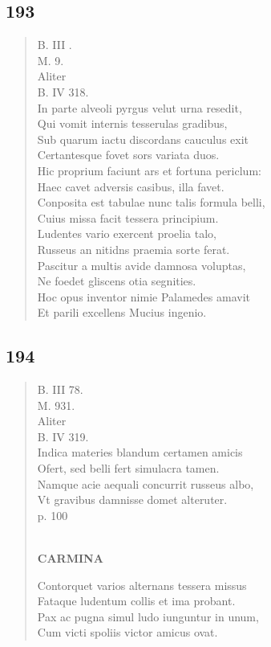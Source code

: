 \documentclass[11pt, a4paper]{report}
\begin{document}
            \subsection*{193}
      \begin{verse}
      B. III . \\ M. 9. \\ Aliter \\ B. IV 318. \\ In parte alveoli pyrgus velut urna resedit, \\ Qui vomit internis tesserulas gradibus, \\ Sub quarum iactu discordans cauculus exit \\ Certantesque fovet sors variata duos. \\ Hic proprium faciunt  \lbrack ars \rbrack  et fortuna periclum: \\ Haec cavet adversis casibus, illa favet. \\ Conposita est tabulae nunc talis formula belli, \\ Cuius missa facit tessera principium. \\ Ludentes vario exercent proelia talo, \\ Russeus an nitidns praemia sorte ferat. \\ Pascitur a multis avide damnosa voluptas, \\ Ne foedet gliscens otia segnities. \\ Hoc opus inventor nimie Palamedes amavit \\ Et parili excellens Mucius ingenio. \\ 
      \end{verse}
  
            \subsection*{194}
      \begin{verse}
      B. III 78. \\ M. 931. \\ Aliter \\ B. IV 319. \\ Indica materies blandum certamen amicis \\ Ofert, sed belli fert simulacra tamen. \\ Namque acie aequali concurrit russeus albo, \\ Vt gravibus damnisse domet alteruter. \\ p. 100 \\ 
        ﻿\pagebreak 
    \begin{center} \textbf{CARMINA} \end{center} \marginpar{[160]} Contorquet varios alternans tessera missus \\ Fataque ludentum collis et ima probant. \\ Pax ac pugna simul ludo iunguntur in unum, \\ Cum victi spoliis victor amicus ovat. \\ 
      \end{verse}
  
\end{document}
